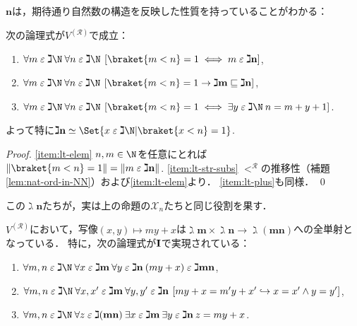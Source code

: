 \documentclass[realisability.tex]{subfiles}
\begin{document}
$\mathbf{n}$は，期待通り自然数の構造を反映した性質を持っていることがわかる：
\begin{lemma}\label{lem:gimel-n-props}
 次の論理式が$V^{(\mathcal{R})}$で成立：
 \begin{enumerate}
  \item \label{item:lt-elem}$\forall m \strin \gimel \N\: \forall n \strin \gimel \N\: \left[ \braket{m < n} = 1 \iff m \strin \gimel\mathbf{n}\right]$,
  \item \label{item:lt-str-subs}$\forall m \strin \gimel \N\: \forall n \strin \gimel \N\: \left[ \braket{m < n} = 1 \to \gimel \mathbf{m} \sqsubseteq \gimel \mathbf{n}\right]$,
  \item \label{item:lt-plus}$\forall m \strin \gimel \N\: \forall n \strin \gimel \N\: \left[ \braket{m < n} = 1 \iff \exists y \strin \gimel \N\: n = m + y + 1\right]$.
 \end{enumerate}
 よって特に$\gimel \mathbf{n} \simeq \Set{x \strin \gimel \N | \braket{x < n} = 1}$.
\end{lemma}
\begin{proof}
 \ref{item:lt-elem} $n, m \in \N$を任意にとれば$\|\braket{m < n} = 1\| = \|m \strin \gimel \mathbf{n}\|$.
 \ref{item:lt-str-subs} $<^{\mathcal{R}}$の推移性（補題\ref{lem:nat-ord-in-NN}）および\ref{item:lt-elem}より．
 \ref{item:lt-plus}も同様． \qed
\end{proof}
この$\gimel\mathbf{n}$たちが，実は上の命題の$\mathcal{X}_n$たちと同じ役割を果す．
\begin{lemma}\label{lem:natural-bij-prod}
 $V^{(\mathcal{R})}$において，写像$(x, y) \mapsto my + x$は$\gimel \mathbf{m} \times \gimel \mathbf{n} \to \gimel(\mathbf{mn})$への全単射となっている．
 特に，次の論理式が$\mathsf{\mathbf{I}}$で実現されている：
 \begin{enumerate}
  \item $\forall m, n \strin \gimel \N\: \forall x \strin \gimel \mathbf{m}\: \forall y \strin \gimel \mathbf{n}\: (my + x) \strin \gimel \mathbf{mn}$,
  \item $\forall m, n \strin \gimel \N\:
         \forall x, x' \strin \gimel \mathbf{m} \: \forall y, y' \strin \gimel \mathbf{n}\:
         \left[ my + x = m'y + x' \hookrightarrow x = x'\land y = y' \right]$,
  \item $\forall m,n \strin \gimel \N\:\forall z \strin \gimel(\mathbf{mn}) \:
         \exists x \strin \gimel \mathbf{m} \: \exists y \strin \gimel \mathbf{n}\:
         z = my + x$.
 \end{enumerate}
\end{lemma}
\end{document}
